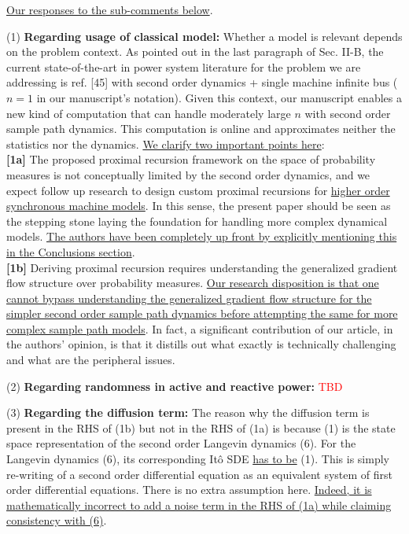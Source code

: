 \documentclass[12pt,onecolumn]{IEEEtran}
\newcommand{\blue}{\color{blue}}
\newcommand{\red}{\textcolor{red}}
\newcommand{\nib}{\noindent  {\bf Response:} }
\begin{document}
{\nib{ \blue \ul{Our responses to the sub-comments below}.

(1) \textbf{Regarding usage of classical model:} Whether a model is relevant depends on the problem context. As pointed out in the last paragraph of Sec. II-B, the current state-of-the-art in power system literature for the problem we are addressing is ref. [45] with second order dynamics + single machine infinite bus ($n=1$ in our manuscript's notation). Given this context, our manuscript enables a new kind of computation that can handle moderately large $n$ with second order sample path dynamics. This computation is online and approximates neither the statistics nor the dynamics.  \ul{We clarify two important points here}:\\ \textbf{[1a]} The proposed proximal recursion framework on the space of probability measures is not conceptually limited by the second order dynamics, and we expect follow up research to design custom proximal recursions for \ul{higher order synchronous machine models}. In this sense, the present paper should be seen as the stepping stone laying the foundation for handling more complex dynamical models. \ul{The authors have been completely up front by explicitly mentioning this in the Conclusions section}. \\ \textbf{[1b]} Deriving proximal recursion requires understanding the generalized gradient flow structure over probability measures. \ul{Our research disposition is that one cannot bypass understanding the generalized gradient flow structure for the simpler second order sample path dynamics before attempting the same for more complex sample path models}. In fact, a significant contribution of our article, in the authors' opinion, is that it distills out what exactly is technically challenging and what are the peripheral issues.

(2) \textbf{Regarding randomness in active and reactive power:} {\red{TBD}} 

(3) \textbf{Regarding the diffusion term:} The reason why the diffusion term is present in the RHS of (1b) but not in the RHS of (1a) is because (1) is the state space representation of the second order Langevin dynamics (6). For the Langevin dynamics (6), its corresponding It\^{o} SDE \ul{has to be} (1). This is simply re-writing of a second order differential equation as an equivalent system of first order differential equations. There is no extra assumption here. \ul{Indeed, it is mathematically incorrect to add a noise term in the RHS of (1a) while claiming consistency with (6)}.

}}
\end{document}
